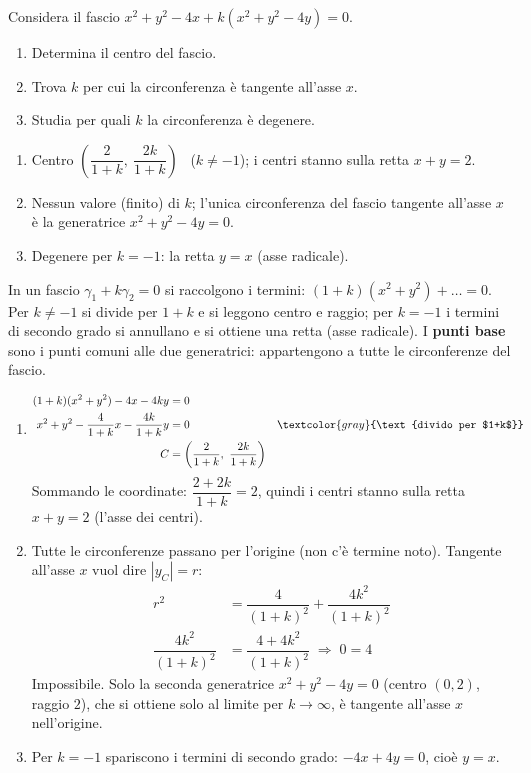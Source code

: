 
\begin{question}[ID=6.2, subtitle={Fascio $x^2+y^2-4x+k(x^2+y^2-4y)=0$: centro e degenere}, difficulty=media, tags={fasci, circonferenze}]
Considera il fascio $x^2+y^2-4x+k(x^2+y^2-4y)=0$.
\begin{enumerate}
\item Determina il centro del fascio.
\item Trova $k$ per cui la circonferenza è tangente all'asse $x$.
\item Studia per quali $k$ la circonferenza è degenere.
\end{enumerate}
\begin{solution}
\begin{enumerate}
    \item Centro $\left(\dfrac{2}{1+k},\ \dfrac{2k}{1+k}\right)$ \ ($k\neq-1$); i centri stanno sulla retta $x+y=2$.
    \item Nessun valore (finito) di $k$; l'unica circonferenza del fascio tangente all'asse $x$ è la generatrice $x^2+y^2-4y=0$.
    \item Degenere per $k=-1$: la retta $y=x$ (asse radicale).
\end{enumerate}
\end{solution}
\begin{explanation}
In un fascio $\gamma_1+k\gamma_2=0$ si raccolgono i termini: $(1+k)(x^2+y^2)+\dots=0$. Per $k\neq-1$ si divide per $1+k$ e si leggono centro e raggio; per $k=-1$ i termini di secondo grado si annullano e si ottiene una retta (asse radicale). I \textbf{punti base} sono i punti comuni alle due generatrici: appartengono a tutte le circonferenze del fascio.
\begin{enumerate}
    \item \[\begin{aligned}
    (1+k)(x^2+y^2)-4x-4ky &= 0\\
    x^2+y^2-\dfrac{4}{1+k}x-\dfrac{4k}{1+k}y &= 0 && \textcolor{gray}{\text{divido per $1+k$}}\\
    C &= \left(\dfrac{2}{1+k},\ \dfrac{2k}{1+k}\right)
    \end{aligned}\]
    Sommando le coordinate: $\dfrac{2+2k}{1+k}=2$, quindi i centri stanno sulla retta $x+y=2$ (l'asse dei centri).
    \item Tutte le circonferenze passano per l'origine (non c'è termine noto). Tangente all'asse $x$ vuol dire $|y_C|=r$:
    \[\begin{aligned}
    r^2 &= \dfrac{4}{(1+k)^2}+\dfrac{4k^2}{(1+k)^2}\\
    \dfrac{4k^2}{(1+k)^2} &= \dfrac{4+4k^2}{(1+k)^2} \;\Rightarrow\; 0=4
    \end{aligned}\]
    Impossibile. Solo la seconda generatrice $x^2+y^2-4y=0$ (centro $(0,2)$, raggio $2$), che si ottiene solo al limite per $k\to\infty$, è tangente all'asse $x$ nell'origine.
    \item Per $k=-1$ spariscono i termini di secondo grado: $-4x+4y=0$, cioè $y=x$.
\end{enumerate}
\end{explanation}
\end{question}

